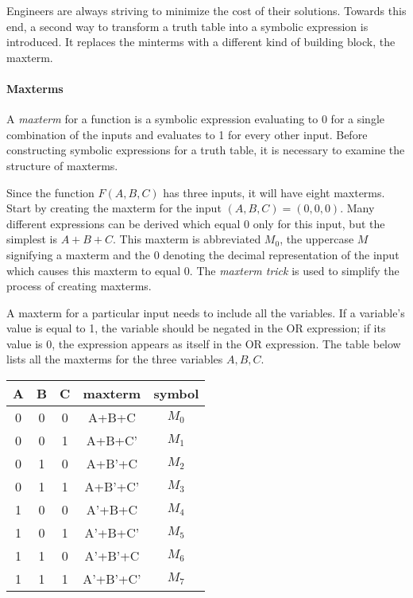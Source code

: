 Engineers are always striving to minimize the cost of their solutions.
Towards this end, a second way to transform a truth table into a 
symbolic expression is introduced.  It replaces the minterms with 
a different kind of building block, the maxterm.

\paragraph{Maxterms}
A \textit{maxterm} for a function is a symbolic expression evaluating
to 0 for a single combination of the inputs and evaluates to 1 for 
every other input.  Before constructing symbolic expressions for
a truth table, it is necessary to examine the structure of maxterms.

Since the function $F(A,B,C)$ has three inputs, it will have eight 
maxterms.  Start by creating the maxterm for the input $(A,B,C)=(0,0,0)$.
Many different expressions can be derived which equal 0 only for
this input, but the simplest is $A+B+C$.  This maxterm is
abbreviated $M_0$, the uppercase $M$ signifying a maxterm 
and the 0 denoting the decimal representation of the input which 
causes this maxterm to equal 0.  The \textit{maxterm trick} 
 is used to simplify the process of creating
maxterms.  

A maxterm for a particular input needs to include all the variables.
If a variable's value is equal to 1, the variable should be negated 
in the OR expression; if its value is 0, the expression appears as itself in the
OR expression. The table below lists all the maxterms for the three 
variables $A,B,C$.

\begin{tabular}{c|c|c||c|c}
A & B & C & maxterm   & symbol \\ \hline
0 & 0 & 0 & A+B+C     & $M_0$   \\ \hline
0 & 0 & 1 & A+B+C'    & $M_1$   \\ \hline
0 & 1 & 0 & A+B'+C    & $M_2$   \\ \hline
0 & 1 & 1 & A+B'+C'   & $M_3$   \\ \hline
1 & 0 & 0 & A'+B+C    & $M_4$   \\ \hline
1 & 0 & 1 & A'+B+C'   & $M_5$   \\ \hline
1 & 1 & 0 & A'+B'+C   & $M_6$   \\ \hline
1 & 1 & 1 & A'+B'+C'  & $M_7$   \\ 
\end{tabular}


